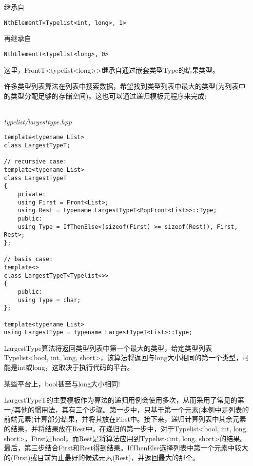 继承自

\begin{lstlisting}[style=styleCXX]
NthElementT<Typelist<int, long>, 1>
\end{lstlisting}

再继承自

\begin{lstlisting}[style=styleCXX]
NthElementT<Typelist<long>, 0>
\end{lstlisting}

这里，FrontT<typelist<long>{}>继承自通过嵌套类型Type的结果类型。


许多类型列表算法在列表中搜索数据，希望找到类型列表中最大的类型(为列表中的类型分配足够的存储空间)。这也可以通过递归模板元程序来完成:

\hspace*{\fill} \\ %
\noindent
\textit{typelist/largesttype.hpp}
\begin{lstlisting}[style=styleCXX]
template<typename List>
class LargestTypeT;

// recursive case:
template<typename List>
class LargestTypeT
{
	private:
	using First = Front<List>;
	using Rest = typename LargestTypeT<PopFront<List>>::Type;
	public:
	using Type = IfThenElse<(sizeof(First) >= sizeof(Rest)), First, Rest>;
};

// basis case:
template<>
class LargestTypeT<Typelist<>>
{
	public:
	using Type = char;
};

template<typename List>
using LargestType = typename LargestTypeT<List>::Type;
\end{lstlisting}

LargestType算法将返回类型列表中第一个最大的类型，给定类型列表Typelist<bool, int, long, short>，该算法将返回与long大小相同的第一个类型，可能是int或long，这取决于执行代码的平台。

\begin{tcolorbox}[colback=webgreen!5!white,colframe=webgreen!75!black]
\hspace*{0.75cm}某些平台上，bool甚至与long大小相同!
\end{tcolorbox}

LargestTypeT的主要模板作为算法的递归用例会使用多次，从而采用了常见的第一/其他的惯用法，其有三个步骤。第一步中，只基于第一个元素(本例中是列表的前端元素)计算部分结果，并将其放在First中。接下来，递归计算列表中其余元素的结果，并将结果放在Rest中。在递归的第一步中，对于Typelist<bool, int, long, short>，First是bool，而Rest是将算法应用到Typelist<int, long, short>的结果。最后，第三步结合First和Rest得到结果。IfThenElse选择列表中第一个元素中较大的(First)或目前为止最好的候选元素(Rest)，并返回最大的那个。

